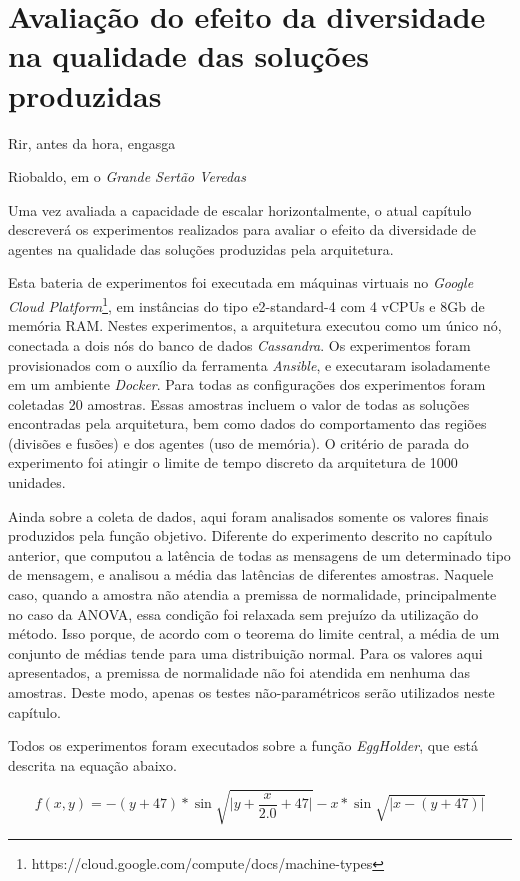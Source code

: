 \chapter{Avaliação do efeito da diversidade na qualidade das soluções produzidas}
\label{chap:exp_diversidade}
\epigraph{Rir, antes da hora, engasga}{Riobaldo, em o \textit{Grande Sertão Veredas}}

Uma vez avaliada a capacidade de escalar horizontalmente, o atual capítulo descreverá os experimentos realizados para avaliar o efeito da diversidade de agentes na qualidade das soluções produzidas pela arquitetura.

Esta bateria de experimentos foi executada em máquinas virtuais no \textit{Google Cloud Platform}\footnote{https://cloud.google.com/compute/docs/machine-types}, em instâncias do tipo e2-standard-4 com 4 vCPUs e 8Gb de memória RAM. Nestes experimentos, a arquitetura executou como um único nó, conectada a dois nós do banco de dados \textit{Cassandra}. Os experimentos foram provisionados com o auxílio da ferramenta \textit{Ansible}, e executaram isoladamente em um ambiente \textit{Docker}. Para todas as configurações dos experimentos foram coletadas 20 amostras. Essas amostras incluem o valor de todas as soluções encontradas pela arquitetura, bem como dados do comportamento das regiões (divisões e fusões) e dos agentes (uso de memória). O critério de parada do experimento foi atingir o limite de tempo discreto da arquitetura de 1000 unidades.

Ainda sobre a coleta de dados, aqui foram analisados somente os valores finais produzidos pela função objetivo. Diferente do experimento descrito no capítulo anterior, que computou a latência de todas as mensagens de um determinado tipo de mensagem, e analisou a média das latências de diferentes amostras. Naquele caso, quando a amostra não atendia a premissa de normalidade, principalmente no caso da ANOVA, essa condição foi relaxada sem prejuízo da utilização do método. Isso porque, de acordo com o teorema do limite central, a média de um conjunto de médias tende para uma distribuição normal.  Para os valores aqui apresentados, a premissa de normalidade não foi atendida em nenhuma das amostras. Deste modo, apenas os testes não-paramétricos serão utilizados neste capítulo. 

Todos os experimentos foram executados sobre a função \textit{EggHolder}, que está descrita na equação abaixo. 

\begin{equation*}
  f(x, y) = -(y + 47) * \sin{\sqrt{\big| y + \frac{x}{2.0} + 47 \big| }} - x * \sin{\sqrt{\big|x - (y + 47)\big|}} 
\end{equation*}

